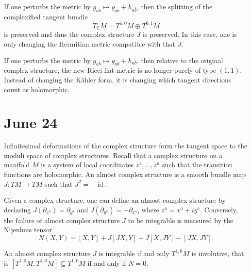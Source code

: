 \documentclass[12pt]{article}
\begin{document}
If one perturbs the metric by $g_{a\bar b}\mapsto g_{a\bar b}+h_{a\bar b}$, then the splitting of the complexified tangent bundle
\[T_\mathbb C M = T^{1,0}M\oplus T^{0,1}M\]
is preserved and thus the complex structure $J$ is preserved. In this case, one is only changing the Hermitian metric compatible with that $J$.

If one perturbs the metric by $g_{ab}\mapsto g_{ab}+h_{ab}$, then relative to the original complex structure, the new Ricci-flat metric is no longer purely of type $(1,1)$. Instead of changing the Kähler form, it is changing which tangent directions count as holomorphic.

\section{June 24}
Infinitesimal deformations of the complex structure form the tangent space to the moduli space of complex structures. Recall that a complex structure on a manifold $M$ is a system of local coordinates $z^1,\ldots,z^n$ such that the transition functions are holomorphic. An almost complex structure is a smooth bundle map $J:TM\to TM$ such that $J^2=-\operatorname{id}$.

Given a complex structure, one can define an almost complex structure by declaring $J(\partial_{x^a}) = \partial_{y^a}$ and $J(\partial_{y^a}) = -\partial_{x^a}$, where $z^a = x^a + i y^a$. Conversely, the failure of almost complex structure $J$ to be integrable is measured by the Nijenhuis tensor
\[
    N(X,Y) = [X,Y] + J[JX,Y] + J[X,JY] - [JX,JY].
\]

\begin{theorem}
     An almost complex structure $J$ is integrable if and only $T^{1,0}M$ is involutive, that is $[T^{1,0}M,T^{1,0}M]\subseteq T^{1,0}M$ if and only if $N=0$.
\end{theorem}
\end{document}
